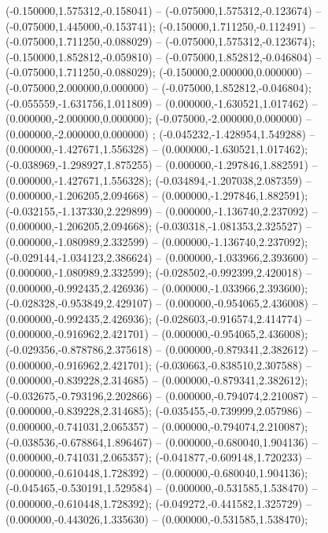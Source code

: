 (-0.150000,1.575312,-0.158041) -- (-0.075000,1.575312,-0.123674) -- (-0.075000,1.445000,-0.153741);
 (-0.150000,1.711250,-0.112491) -- (-0.075000,1.711250,-0.088029) -- (-0.075000,1.575312,-0.123674);
 (-0.150000,1.852812,-0.059810) -- (-0.075000,1.852812,-0.046804) -- (-0.075000,1.711250,-0.088029);
 (-0.150000,2.000000,0.000000) -- (-0.075000,2.000000,0.000000) -- (-0.075000,1.852812,-0.046804);
 (-0.055559,-1.631756,1.011809) -- (0.000000,-1.630521,1.017462) -- (0.000000,-2.000000,0.000000);
 (-0.075000,-2.000000,0.000000) -- (0.000000,-2.000000,0.000000) ;
 (-0.045232,-1.428954,1.549288) -- (0.000000,-1.427671,1.556328) -- (0.000000,-1.630521,1.017462);
 (-0.038969,-1.298927,1.875255) -- (0.000000,-1.297846,1.882591) -- (0.000000,-1.427671,1.556328);
 (-0.034894,-1.207038,2.087359) -- (0.000000,-1.206205,2.094668) -- (0.000000,-1.297846,1.882591);
 (-0.032155,-1.137330,2.229899) -- (0.000000,-1.136740,2.237092) -- (0.000000,-1.206205,2.094668);
 (-0.030318,-1.081353,2.325527) -- (0.000000,-1.080989,2.332599) -- (0.000000,-1.136740,2.237092);
 (-0.029144,-1.034123,2.386624) -- (0.000000,-1.033966,2.393600) -- (0.000000,-1.080989,2.332599);
 (-0.028502,-0.992399,2.420018) -- (0.000000,-0.992435,2.426936) -- (0.000000,-1.033966,2.393600);
 (-0.028328,-0.953849,2.429107) -- (0.000000,-0.954065,2.436008) -- (0.000000,-0.992435,2.426936);
 (-0.028603,-0.916574,2.414774) -- (0.000000,-0.916962,2.421701) -- (0.000000,-0.954065,2.436008);
 (-0.029356,-0.878786,2.375618) -- (0.000000,-0.879341,2.382612) -- (0.000000,-0.916962,2.421701);
 (-0.030663,-0.838510,2.307588) -- (0.000000,-0.839228,2.314685) -- (0.000000,-0.879341,2.382612);
 (-0.032675,-0.793196,2.202866) -- (0.000000,-0.794074,2.210087) -- (0.000000,-0.839228,2.314685);
 (-0.035455,-0.739999,2.057986) -- (0.000000,-0.741031,2.065357) -- (0.000000,-0.794074,2.210087);
 (-0.038536,-0.678864,1.896467) -- (0.000000,-0.680040,1.904136) -- (0.000000,-0.741031,2.065357);
 (-0.041877,-0.609148,1.720233) -- (0.000000,-0.610448,1.728392) -- (0.000000,-0.680040,1.904136);
 (-0.045465,-0.530191,1.529584) -- (0.000000,-0.531585,1.538470) -- (0.000000,-0.610448,1.728392);
 (-0.049272,-0.441582,1.325729) -- (0.000000,-0.443026,1.335630) -- (0.000000,-0.531585,1.538470);
